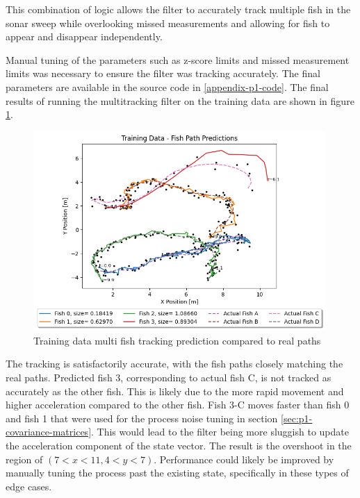 \documentclass[12pt]{article}
\begin{document}
This combination of logic allows the filter to accurately track multiple fish in the sonar sweep while overlooking missed measurements and allowing for fish to appear and disappear independently.

Manual tuning of the parameters such as z-score limits and missed measurement limits was necessary to ensure the filter was tracking accurately. The final parameters are available in the source code in \ref{appendix-p1-code}. The final results of running the multitracking filter on the training data are shown in figure \ref{fig:p1-training-prediction}.

\begin{figure}[H]
    \centering
    \includegraphics[width=0.99\textwidth]{Problem 1/out/p1_training_paths.png}
    \caption{Training data multi fish tracking prediction compared to real paths}
    \label{fig:p1-training-prediction}
\end{figure}

The tracking is satisfactorily accurate, with the fish paths closely matching the real paths. Predicted fish 3, corresponding to actual fish C, is not tracked as accurately as the other fish. This is likely due to the more rapid movement and higher acceleration compared to the other fish. Fish 3-C moves faster than fish 0 and fish 1 that were used for the process noise tuning in section \ref{sec:p1-covariance-matrices}. This would lead to the filter being more sluggish to update the acceleration component of the state vector. The result is the overshoot in the region of $(7 < x < 11, 4 < y < 7)$. Performance could likely be improved by manually tuning the process past the existing state, specifically in these types of edge cases.
\end{document}

